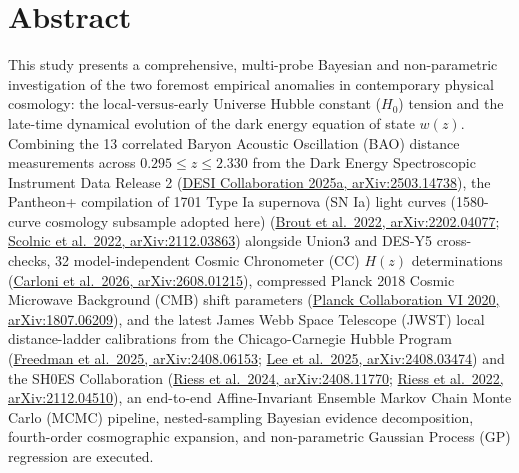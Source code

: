 \documentclass[aps,prd,preprint,superscriptaddress,nofootinbib]{revtex4-2}
\begin{document}
\listoffigures
\vspace{14pt}
\listoftables
\clearpage

\section*{Abstract}

{\small
This study presents a comprehensive, multi-probe Bayesian and non-parametric investigation of the two foremost empirical anomalies in contemporary physical cosmology: the local-versus-early Universe Hubble constant ($H_0$) tension and the late-time dynamical evolution of the dark energy equation of state $w(z)$. Combining the 13 correlated Baryon Acoustic Oscillation (BAO) distance measurements across $0.295 \le z \le 2.330$ from the Dark Energy Spectroscopic Instrument Data Release 2 (\href{https://arxiv.org/abs/2503.14738}{DESI Collaboration 2025a, arXiv:2503.14738}), the Pantheon+ compilation of 1701 Type Ia supernova (SN Ia) light curves (1580-curve cosmology subsample adopted here) (\href{https://arxiv.org/abs/2202.04077}{Brout et al.\ 2022, arXiv:2202.04077}; \href{https://arxiv.org/abs/2112.03863}{Scolnic et al.\ 2022, arXiv:2112.03863}) alongside Union3 and DES-Y5 cross-checks, 32 model-independent Cosmic Chronometer (CC) $H(z)$ determinations (\href{https://arxiv.org/pdf/2608.01215}{Carloni et al.\ 2026, arXiv:2608.01215}), compressed Planck 2018 Cosmic Microwave Background (CMB) shift parameters (\href{https://arxiv.org/abs/1807.06209}{Planck Collaboration VI 2020, arXiv:1807.06209}), and the latest James Webb Space Telescope (JWST) local distance-ladder calibrations from the Chicago-Carnegie Hubble Program (\href{https://arxiv.org/abs/2408.06153}{Freedman et al.\ 2025, arXiv:2408.06153}; \href{https://arxiv.org/abs/2408.03474}{Lee et al.\ 2025, arXiv:2408.03474}) and the SH0ES Collaboration (\href{https://arxiv.org/abs/2408.11770}{Riess et al.\ 2024, arXiv:2408.11770}; \href{https://arxiv.org/pdf/2112.04510}{Riess et al.\ 2022, arXiv:2112.04510}), an end-to-end Affine-Invariant Ensemble Markov Chain Monte Carlo (MCMC) pipeline, nested-sampling Bayesian evidence decomposition, fourth-order cosmographic expansion, and non-parametric Gaussian Process (GP) regression are executed.

}
\end{document}
